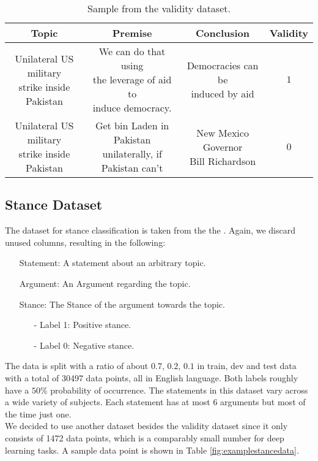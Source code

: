 \begin{table}[H]
	\begin{center}
	\footnotesize
   	\begin{tabular}{|| c | c | c | c||}
   	\hline
   	Topic & Premise & Conclusion & Validity \\
   	\hline\hline
   	\makecell{Unilateral US military \\ strike inside Pakistan} & \makecell{We can do that using \\ the leverage of aid to \\ induce democracy.} & \makecell{Democracies can be \\ induced by aid} & $1$ \\
   	\hline
   	\makecell{Unilateral US military \\ strike inside Pakistan} & \makecell{Get bin Laden in Pakistan \\ unilaterally, if Pakistan can't} & \makecell{New Mexico Governor \\ Bill Richardson} & $0$ \\
 	\hline
	\end{tabular}
  \end{center}
	\caption{Sample from the validity dataset.}%
  	\label{fig:examplevaliditydata}
\end{table}

\subsection{Stance Dataset} \label{sec:stancedata}

The dataset for stance classification is taken from the the  \cite{stancedata, ibm}. Again, we discard unused columns, resulting in the following:
\begin{enumerate}
	\item[\textbullet] Statement: A statement about an arbitrary topic.
	\item[\textbullet] Argument: An Argument regarding the topic.
	\item[\textbullet] Stance: The Stance of the argument towards the topic.
	\begin{enumerate}
		\item[-] Label 1: Positive stance.
		\item[-] Label 0: Negative stance.
	\end{enumerate}
\end{enumerate}
The data is split with a ratio of about $0.7$, $0.2$, $0.1$ in train, dev and test data with a total of \num[group-separator={,}]{30497} data points, all in English language. Both labels roughly have a $50\%$ probability of occurrence. The statements in this dataset vary across a wide variety of subjects. Each statement has at most $6$ arguments \cite{stancedata} but most of the time just one. \\
We decided to use another dataset besides the validity dataset since it only consists of \num[group-separator={,}]{1472} data points, which is a comparably small number for deep learning tasks. A sample data point is shown in Table \ref{fig:examplestancedata}.


